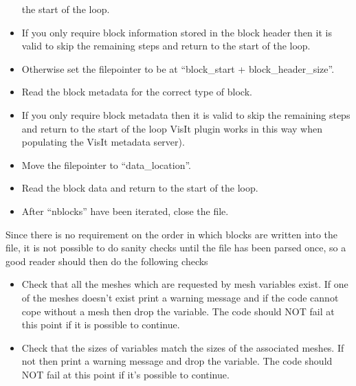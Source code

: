 \documentclass[12pt]{article}
\begin{document}
\begin{itemize}
  the start of the loop.
\item If you only require block information stored in the block header then
  it is valid to skip the remaining steps and return to the start of the loop.
\item Otherwise set the filepointer to be at ``block\_start +
  block\_header\_size''.
\item Read the block metadata for the correct type of block.
\item If you only require block metadata then it is valid to skip the
  remaining steps and return to the start of the loop VisIt plugin works in
  this way when populating the VisIt metadata server).
\item Move the filepointer to ``data\_location''.
\item Read the block data and return to the start of the loop.
\item After ``nblocks'' have been iterated, close the file.
\end{itemize}

Since there is no requirement on the order in which blocks are written into
the file, it is not possible to do sanity checks until the file has been
parsed once, so a good reader should then do the following checks
\begin{itemize}
\item Check that all the meshes which are requested by mesh variables exist. If
  one of the meshes doesn't exist print a warning message and if the code
  cannot cope without a mesh then drop the variable. The code should NOT fail
  at this point if it is possible to continue.
\item Check that the sizes of variables match the sizes of the associated
  meshes. If not then print a warning message and drop the variable. The code
  should NOT fail at this point if it's possible to continue.
\end{itemize}

\ifdefined\epoch
\else
\end{document}
